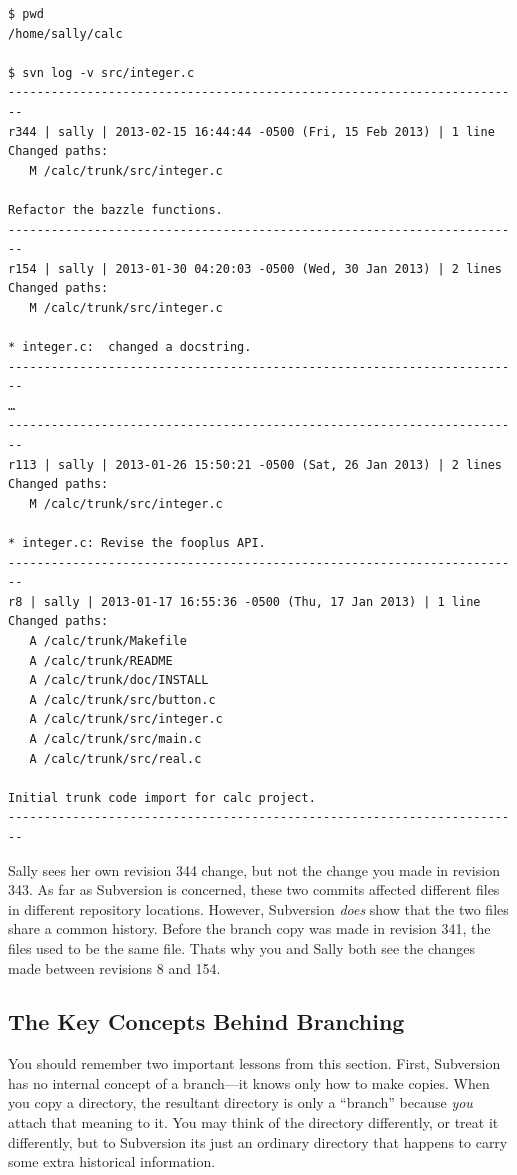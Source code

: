 \begin{verbatim}
$ pwd
/home/sally/calc

$ svn log -v src/integer.c
------------------------------------------------------------------------
r344 | sally | 2013-02-15 16:44:44 -0500 (Fri, 15 Feb 2013) | 1 line
Changed paths:
   M /calc/trunk/src/integer.c

Refactor the bazzle functions.
------------------------------------------------------------------------
r154 | sally | 2013-01-30 04:20:03 -0500 (Wed, 30 Jan 2013) | 2 lines
Changed paths:
   M /calc/trunk/src/integer.c

* integer.c:  changed a docstring.
------------------------------------------------------------------------
…
------------------------------------------------------------------------
r113 | sally | 2013-01-26 15:50:21 -0500 (Sat, 26 Jan 2013) | 2 lines
Changed paths:
   M /calc/trunk/src/integer.c

* integer.c: Revise the fooplus API.
------------------------------------------------------------------------
r8 | sally | 2013-01-17 16:55:36 -0500 (Thu, 17 Jan 2013) | 1 line
Changed paths:
   A /calc/trunk/Makefile
   A /calc/trunk/README
   A /calc/trunk/doc/INSTALL
   A /calc/trunk/src/button.c
   A /calc/trunk/src/integer.c
   A /calc/trunk/src/main.c
   A /calc/trunk/src/real.c

Initial trunk code import for calc project.
------------------------------------------------------------------------
\end{verbatim}

Sally sees her own revision 344 change, but not the change you made in
revision 343. As far as Subversion is concerned, these two commits
affected different files in different repository locations. However,
Subversion \emph{does} show that the two files share a common history.
Before the branch copy was made in revision 341, the files used to be
the same file. That\textquotesingle s why you and Sally both see the
changes made between revisions 8 and 154.

\subsection{The Key Concepts Behind
Branching}\label{svn.branchmerge.using.concepts}

You should remember two important lessons from this section. First,
Subversion has no internal concept of a branch---it knows only how to
make copies. When you copy a directory, the resultant directory is only
a ``branch'' because \emph{you} attach that meaning to it. You may think
of the directory differently, or treat it differently, but to Subversion
it\textquotesingle s just an ordinary directory that happens to carry
some extra historical information.


